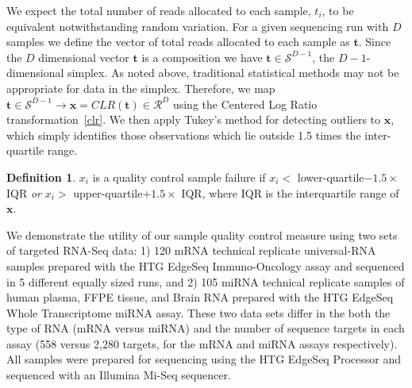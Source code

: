 \documentclass{article}\usepackage[]{graphicx}\usepackage[]{color}
\theoremstyle{definition}
\newtheorem{definition}{Definition}
\begin{document}
We expect the total number of reads allocated to each sample, $t_i$, to be equivalent notwithstanding random variation. For a given sequencing run with $D$ samples we define the vector of total reads allocated to each sample as $\mathbf{t}$.  Since the $D$ dimensional vector $\mathbf{t}$ is a composition we have $\mathbf{t} \in \mathcal{S}^{D-1}$, the $D-1$-dimensional simplex. As noted above, traditional statistical methods may not be appropriate for data in the simplex.  Therefore, we map $\mathbf{t} \in \mathcal{S}^{D-1} \rightarrow \mathbf{x} = CLR(\mathbf{t}) \in \mathcal{R}^D$ using the Centered Log Ratio transformation~\ref{clr}.  We then apply Tukey's method for detecting outliers to $\mathbf{x}$, which simply identifies those observations which lie outside 1.5 times the inter-quartile range.

\theoremstyle{definition}
\begin{definition}
$x_i$ is a quality control sample failure if $x_i <$ lower-quartile$- 1.5 \times$ IQR \emph{or}  $x_i >$ upper-quartile$+ 1.5 \times$ IQR, where IQR is the interquartile range of $\mathbf{x}$.
\end{definition}

We demonstrate the utility of our sample quality control measure using two sets of targeted RNA-Seq data: 1) 120 mRNA technical replicate universal-RNA samples prepared with the HTG EdgeSeq Immuno-Oncology assay and sequenced in 5 different equally sized runs, and 2) 105 miRNA technical replicate samples of human plasma, FFPE tissue, and Brain RNA prepared with the HTG EdgeSeq Whole Transcriptome miRNA assay.  These two data sets differ in the both the type of RNA (mRNA versus miRNA) and the number of sequence targets in each assay (558 versus 2,280 targets, for the mRNA and miRNA assays respectively).  All samples were prepared for sequencing using the HTG EdgeSeq Processor and sequenced with an Illumina Mi-Seq sequencer.\\
\end{document}
